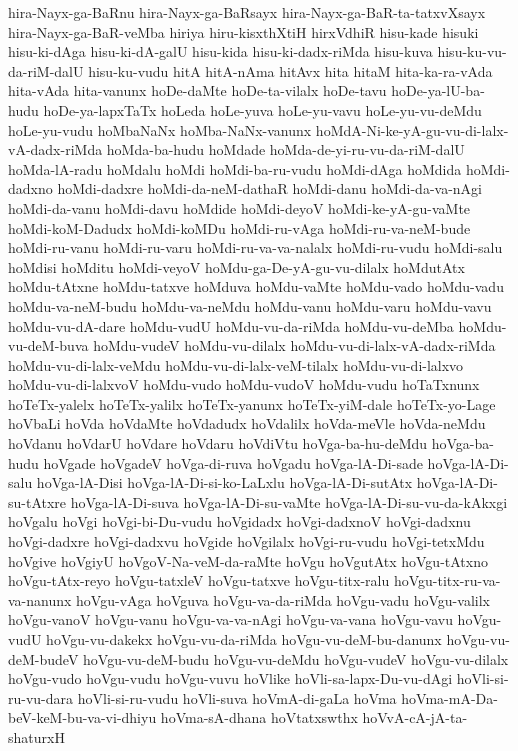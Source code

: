 {hira-Nayx-ga-BaRnu
hira-Nayx-ga-BaRsayx
hira-Nayx-ga-BaR-ta-tatxvXsayx
hira-Nayx-ga-BaR-veMba
hiriya
hiru-kisxthXtiH
hirxVdhiR
hisu-kade
hisuki
hisu-ki-dAga
hisu-ki-dA-galU
hisu-kida
hisu-ki-dadx-riMda
hisu-kuva
hisu-ku-vu-da-riM-dalU
hisu-ku-vudu
hitA
hitA-nAma
hitAvx
hita
hitaM
hita-ka-ra-vAda
hita-vAda
hita-vanunx
hoDe-daMte
hoDe-ta-vilalx
hoDe-tavu
hoDe-ya-lU-ba-hudu
hoDe-ya-lapxTaTx
hoLeda
hoLe-yuva
hoLe-yu-vavu
hoLe-yu-vu-deMdu
hoLe-yu-vudu
hoMbaNaNx
hoMba-NaNx-vanunx
hoMdA-Ni-ke-yA-gu-vu-di-lalx-vA-dadx-riMda
hoMda-ba-hudu
hoMdade
hoMda-de-yi-ru-vu-da-riM-dalU
hoMda-lA-radu
hoMdalu
hoMdi
hoMdi-ba-ru-vudu
hoMdi-dAga
hoMdida
hoMdi-dadxno
hoMdi-dadxre
hoMdi-da-neM-dathaR
hoMdi-danu
hoMdi-da-va-nAgi
hoMdi-da-vanu
hoMdi-davu
hoMdide
hoMdi-deyoV
hoMdi-ke-yA-gu-vaMte
hoMdi-koM-Dadudx
hoMdi-koMDu
hoMdi-ru-vAga
hoMdi-ru-va-neM-bude
hoMdi-ru-vanu
hoMdi-ru-varu
hoMdi-ru-va-va-nalalx
hoMdi-ru-vudu
hoMdi-salu
hoMdisi
hoMditu
hoMdi-veyoV
hoMdu-ga-De-yA-gu-vu-dilalx
hoMdutAtx
hoMdu-tAtxne
hoMdu-tatxve
hoMduva
hoMdu-vaMte
hoMdu-vado
hoMdu-vadu
hoMdu-va-neM-budu
hoMdu-va-neMdu
hoMdu-vanu
hoMdu-varu
hoMdu-vavu
hoMdu-vu-dA-dare
hoMdu-vudU
hoMdu-vu-da-riMda
hoMdu-vu-deMba
hoMdu-vu-deM-buva
hoMdu-vudeV
hoMdu-vu-dilalx
hoMdu-vu-di-lalx-vA-dadx-riMda
hoMdu-vu-di-lalx-veMdu
hoMdu-vu-di-lalx-veM-tilalx
hoMdu-vu-di-lalxvo
hoMdu-vu-di-lalxvoV
hoMdu-vudo
hoMdu-vudoV
hoMdu-vudu
hoTaTxnunx
hoTeTx-yalelx
hoTeTx-yalilx
hoTeTx-yanunx
hoTeTx-yiM-dale
hoTeTx-yo-Lage
hoVbaLi
hoVda
hoVdaMte
hoVdadudx
hoVdalilx
hoVda-meVle
hoVda-neMdu
hoVdanu
hoVdarU
hoVdare
hoVdaru
hoVdiVtu
hoVga-ba-hu-deMdu
hoVga-ba-hudu
hoVgade
hoVgadeV
hoVga-di-ruva
hoVgadu
hoVga-lA-Di-sade
hoVga-lA-Di-salu
hoVga-lA-Disi
hoVga-lA-Di-si-ko-LaLxlu
hoVga-lA-Di-sutAtx
hoVga-lA-Di-su-tAtxre
hoVga-lA-Di-suva
hoVga-lA-Di-su-vaMte
hoVga-lA-Di-su-vu-da-kAkxgi
hoVgalu
hoVgi
hoVgi-bi-Du-vudu
hoVgidadx
hoVgi-dadxnoV
hoVgi-dadxnu
hoVgi-dadxre
hoVgi-dadxvu
hoVgide
hoVgilalx
hoVgi-ru-vudu
hoVgi-tetxMdu
hoVgive
hoVgiyU
hoVgoV-Na-veM-da-raMte
hoVgu
hoVgutAtx
hoVgu-tAtxno
hoVgu-tAtx-reyo
hoVgu-tatxleV
hoVgu-tatxve
hoVgu-titx-ralu
hoVgu-titx-ru-va-va-nanunx
hoVgu-vAga
hoVguva
hoVgu-va-da-riMda
hoVgu-vadu
hoVgu-valilx
hoVgu-vanoV
hoVgu-vanu
hoVgu-va-va-nAgi
hoVgu-va-vana
hoVgu-vavu
hoVgu-vudU
hoVgu-vu-dakekx
hoVgu-vu-da-riMda
hoVgu-vu-deM-bu-danunx
hoVgu-vu-deM-budeV
hoVgu-vu-deM-budu
hoVgu-vu-deMdu
hoVgu-vudeV
hoVgu-vu-dilalx
hoVgu-vudo
hoVgu-vudu
hoVgu-vuvu
hoVlike
hoVli-sa-lapx-Du-vu-dAgi
hoVli-si-ru-vu-dara
hoVli-si-ru-vudu
hoVli-suva
hoVmA-di-gaLa
hoVma
hoVma-mA-Da-beV-keM-bu-va-vi-dhiyu
hoVma-sA-dhana
hoVtatxswthx
hoVvA-cA-jA-ta-shaturxH
}
